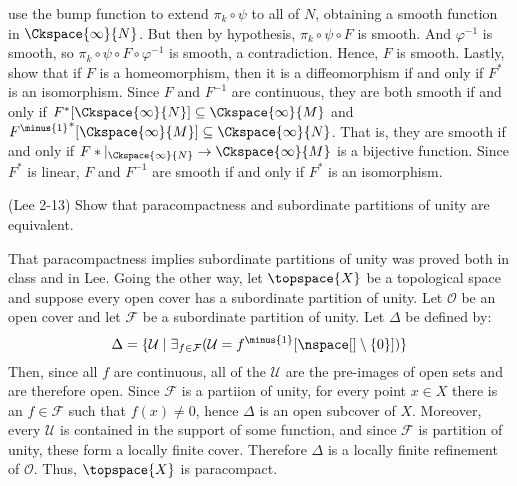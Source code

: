 \documentclass{article}                                                        %
\begin{document}
\begin{solution}
            use the bump function to extend $\pi_{k}\circ\psi$ to all of $N$,
            obtaining a smooth function in $\Ckspace{\infty}{N}$. But then by
            hypothesis, $\pi_{k}\circ\psi\circ{F}$ is smooth. And
            $\varphi^{\minus{1}}$ is smooth, so
            $\pi_{k}\circ\psi\circ{F}\circ\varphi^{\minus{1}}$ is smooth,
            a contradiction. Hence, $F$ is smooth. Lastly, show that if $F$ is a
            homeomorphism, then it is a diffeomorphism if and only if $F^{*}$ is
            an isomorphism. Since $F$ and $F^{\minus{1}}$ are continuous, they
            are both smooth if and only if
            $F^{*}[\Ckspace{\infty}{N}]\subseteq\Ckspace{\infty}{M}$ and
            ${F^{\minus{1}}}^{*}[\Ckspace{\infty}{M}]%
             \subseteq\Ckspace{\infty}{N}$. That is, they are smooth if and only
            if $F*|_{\Ckspace{\infty}{N}}\rightarrow\Ckspace{\infty}{M}$ is a
            bijective function. Since $F^{*}$ is linear, $F$ and $F^{\minus{1}}$
            are smooth if and only if $F^{*}$ is an isomorphism.
        \end{solution}
        \begin{problem}
            (Lee 2-13) Show that paracompactness and subordinate partitions of
            unity are equivalent.
        \end{problem}
        \begin{solution}
            That paracompactness implies subordinate partitions of unity was
            proved both in class and in Lee. Going the other way, let
            $\topspace{X}$ be a topological space and suppose every
            open cover has a subordinate partition of unity. Let $\mathcal{O}$
            be an open cover and let $\mathcal{F}$ be a subordinate partition of
            unity. Let $\Delta$ be defined by:
            \begin{equation}
                \Delta=\{\mathcal{U}\;|\;\exists_{f\in\mathcal{F}}
                (\mathcal{U}=f^{\minus{1}}[\nspace[]\setminus\{0\}])\}
            \end{equation}
            Then, since all $f$ are continuous, all of the $\mathcal{U}$ are the
            pre-images of open sets and are therefore open. Since $\mathcal{F}$
            is a partiion of unity, for every point $x\in{X}$ there is an
            $f\in\mathcal{F}$ such that $f(x)\ne{0}$, hence $\Delta$ is an open
            subcover of $X$. Moreover, every $\mathcal{U}$ is contained in the
            support of some function, and since $\mathcal{F}$ is partition of
            unity, these form a locally finite cover. Therefore $\Delta$ is a
            locally finite refinement of $\mathcal{O}$. Thus, $\topspace{X}$
            is paracompact.
        \end{solution}
\end{document}
